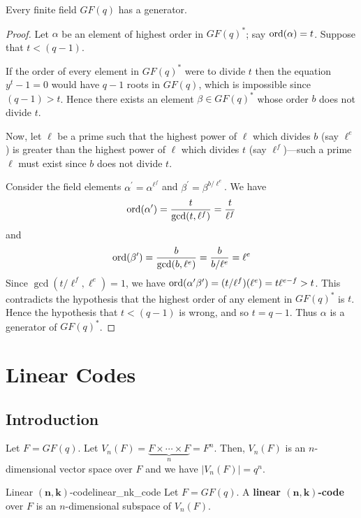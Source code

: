 \begin{Theorem}{}{}
    Every finite field $ GF(q) $ has a generator.
\end{Theorem}

\begin{proof}
    Let $ \alpha $ be an element of highest order in $ GF(q)^* $;
    say $ \operatorname{ord}(\alpha)=t $. Suppose that $ t<(q-1) $.

    If the order of every element in $ GF(q)^* $ were to divide $ t $ then the equation
    $ y^t-1=0 $ would have $ q-1 $ roots in $ GF(q) $, which is impossible
    since $ (q-1)>t $. Hence there exists an element $ \beta\in GF(q)^* $
    whose order $ b $ does not divide $ t $.

    Now, let $ \ell $ be a prime such that the highest power of $ \ell $
    which divides $ b $ (say $ \ell^e $) is greater than the highest
    power of $ \ell $ which divides $ t $ (say $ \ell^f $)---such a prime
    $ \ell $ must exist since $ b $ does not divide $ t $.

    Consider the field elements $ \alpha^{\prime}=\alpha^{\ell^f} $
    and $ \beta^{\prime}=\beta^{b/\ell^e} $. We have
    \[ \operatorname{ord}(\alpha^{\prime})=\frac{t}{\gcd(t,\ell^f)} =\frac{t}{\ell^f} \]
    and
    \[ \operatorname{ord}(\beta^{\prime})=\frac{b}{\gcd(b,\ell^e)} =\frac{b}{b/\ell^e}=\ell^e \]
    Since $ \gcd(t/\ell^f,\ell^e)=1 $, we have $ \operatorname{ord}(\alpha^{\prime}\beta^{\prime})=
        (t/\ell^f)(\ell^e)=t\ell^{e-f}>t $. This contradicts the hypothesis
    that the highest order of any element in $ GF(q)^* $ is $ t $. Hence the
    hypothesis that $ t<(q-1) $ is wrong, and so $ t=q-1 $. Thus $ \alpha $
    is a generator of $ GF(q)^* $.
\end{proof}

\chapter{Linear Codes}
\section{Introduction}
Let $ F=GF(q) $. Let $ V_n(F)=\underbrace{F\times\cdots\times F}_{n}=F^n $.
Then, $ V_n(F) $ is an $ n $-dimensional vector space over $ F $ and
we have $ |V_n(F)|=q^n $.

\begin{Definition}{Linear $ \bm{(n,k)} $-code}{linear_nk_code}
    Let $ F=GF(q) $.
    A \textbf{linear $ \bm{(n,k)} $-code} over $ F $ is an $ n $-dimensional subspace
    of $ V_n(F) $.
\end{Definition}

